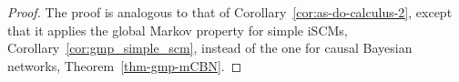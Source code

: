 \begin{proof}
  The proof is analogous to that of Corollary~\ref{cor:as-do-calculus-2}, except that it applies the global Markov property for simple iSCMs, Corollary~\ref{cor:gmp_simple_scm}, instead of the one for causal Bayesian networks, Theorem~\ref{thm-gmp-mCBN}.
\end{proof}

